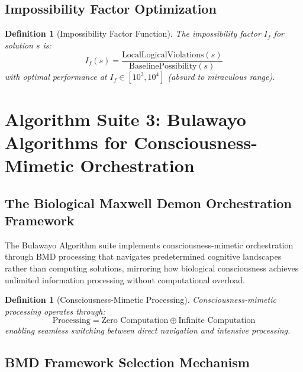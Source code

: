 \documentclass[12pt,a4paper]{article}
\newtheorem{definition}[theorem]{Definition}
\begin{document}
\subsection{Impossibility Factor Optimization}

\begin{definition}[Impossibility Factor Function]
The impossibility factor $I_f$ for solution $s$ is:
\begin{equation}
I_f(s) = \frac{\text{LocalLogicalViolations}(s)}{\text{BaselinePossibility}(s)}
\end{equation}
with optimal performance at $I_f \in [10^3, 10^4]$ (absurd to miraculous range).
\end{definition}

\section{Algorithm Suite 3: Bulawayo Algorithms for Consciousness-Mimetic Orchestration}

\subsection{The Biological Maxwell Demon Orchestration Framework}

The Bulawayo Algorithm suite implements consciousness-mimetic orchestration through BMD processing that navigates predetermined cognitive landscapes rather than computing solutions, mirroring how biological consciousness achieves unlimited information processing without computational overload.

\begin{definition}[Consciousness-Mimetic Processing]
Consciousness-mimetic processing operates through:
\begin{equation}
\text{Processing} = \text{Zero Computation} \oplus \text{Infinite Computation}
\end{equation}
enabling seamless switching between direct navigation and intensive processing.
\end{definition}

\subsection{BMD Framework Selection Mechanism}
\end{document}
